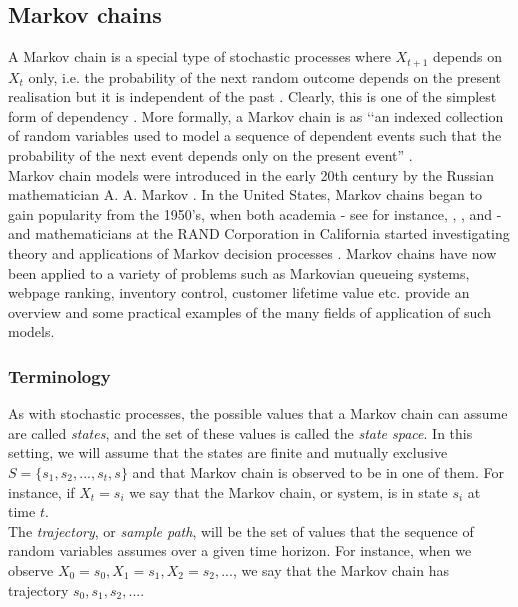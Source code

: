 \documentclass[\main/main.tex]{subfiles}
\begin{document}
\subsection{Markov chains} \label{markov_chain}
A Markov chain is a special type of stochastic processes where $X_{t+1}$ depends on $X_{t}$ only, i.e. the probability of the next random outcome depends on the present realisation but it is independent of the past \citep{Grinstead1997}. Clearly, this is one of the simplest form of dependency \citep{Sheskin2010}. More formally, a Markov chain is as \lq\lq an indexed collection of random variables used to model a sequence of dependent events such that the probability of the next event depends only on the present event'' \citep{Sheskin2010}.\\

Markov chain models were introduced in the early 20th century by the Russian mathematician A. A. Markov \citep{Hayes2013}. In the United States, Markov chains  began to gain popularity from the 1950's, when both academia - see for instance, \cite{Feller1950}, \cite{Howard1960}, and \cite{Kemeny1960} - and mathematicians at the RAND Corporation in California started investigating theory and applications of Markov decision processes \citep{Sheskin2010}. Markov chains have now been applied to a variety of problems such as Markovian queueing systems, webpage ranking, inventory control, customer lifetime value etc. \cite{Ching2006} provide an overview and some practical examples of the many fields of application of such models.\\


\subsubsection{Terminology}

As with stochastic processes, the possible values that a Markov chain can assume are called \textit{states}, and the set of these values is called the \textit{state space}. In this setting, we will assume that the states are finite and mutually exclusive $S = \{s_1,s_2,...,s_t, s\}$ and that Markov chain is observed to be in one of them. For instance, if $X_t = s_i$ we say that the Markov chain, or system, is in state $s_i$ at time $t$.\\


The \textit{trajectory}, or \textit{sample path}, will be the set of values that the sequence of random variables assumes over a given time horizon. For instance, when we observe $X_0 = s_0, X_1 = s_1, X_2 = s_2, ...$, we say that the Markov chain has trajectory $s_0, s_1, s_2,...$. 
\end{document}
